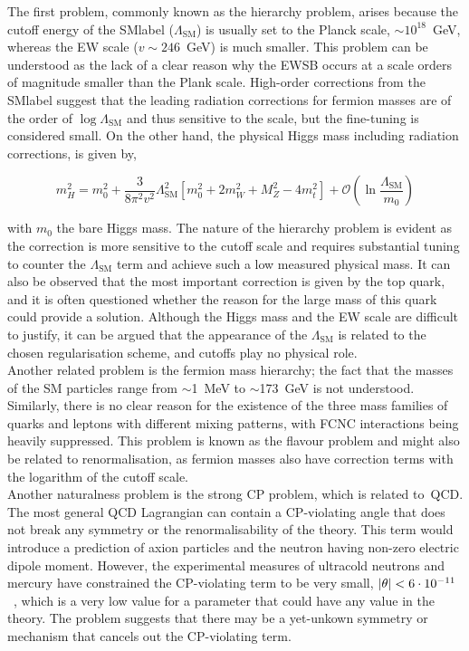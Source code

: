 The first problem, commonly known as the hierarchy problem, arises because the cutoff energy of the \acrshort{SMlabel} ($\Lambda_{\text{SM}}$) is usually set to the Planck scale, $\sim10^{18}$~GeV, whereas the \acrshort{EW} scale ($v\sim246$~GeV) is much smaller. This problem can be understood as the lack of a clear reason why the \acrshort{EWSB} occurs at a scale orders of magnitude smaller than the Plank scale. High-order corrections from the \acrshort{SMlabel} suggest that the leading radiation corrections for fermion masses are of the order of $\log\Lambda_{\text{SM}}$ and thus sensitive to the scale, but the fine-tuning is considered small. On the other hand, the physical Higgs mass including radiation corrections, is given by,

\begin{equation}
    m^2_H = m_0^2 + \frac{3}{8\pi^2v^2}\Lambda_{\text{SM}}^2 [ m_0^2 + 2m_W^2 + M_Z^2 - 4m_t^2] + \mathcal{O}(\ln\frac{\Lambda_{\text{SM}}}{m_0})
\end{equation}

with $m_0$ the bare Higgs mass. The nature of the hierarchy problem is evident as the correction is more sensitive to the cutoff scale and requires substantial tuning to counter the $\Lambda_{\text{SM}}$ term and achieve such a low measured physical mass. It can also be observed that the most important correction is given by the top quark, and it is often questioned whether the reason for the large mass of this quark could provide a solution. Although the Higgs mass and the \acrshort{EW} scale are difficult to justify, it can be argued that the appearance of the $\Lambda_{\text{SM}}$ is related to the chosen regularisation scheme, and cutoffs play no physical role.\\

Another related problem is the fermion mass hierarchy; the fact that the masses of the SM particles range from $\sim$1~MeV to $\sim$173~GeV is not understood. Similarly, there is no clear reason for the existence of the three mass families of quarks and leptons with different mixing patterns, with FCNC interactions being heavily suppressed. This problem is known as the flavour problem and might also be related to renormalisation, as fermion masses also have correction terms with the logarithm of the cutoff scale.\\

Another naturalness problem is the strong CP problem, which is related to~\acrshort{QCD}. The most general QCD Lagrangian can contain a CP-violating angle that does not break any symmetry or the renormalisability of the theory. This term would introduce a prediction of axion particles and the neutron having non-zero electric dipole moment. However, the experimental measures of ultracold neutrons and mercury have constrained the CP-violating term to be very small, $\abs{\theta}<6\cdot10^{-11}$~\cite{PhysRevLett.124.081803}, which is a very low value for a parameter that could have any value in the theory. The problem suggests that there may be a yet-unkown symmetry or mechanism that cancels out the CP-violating term.